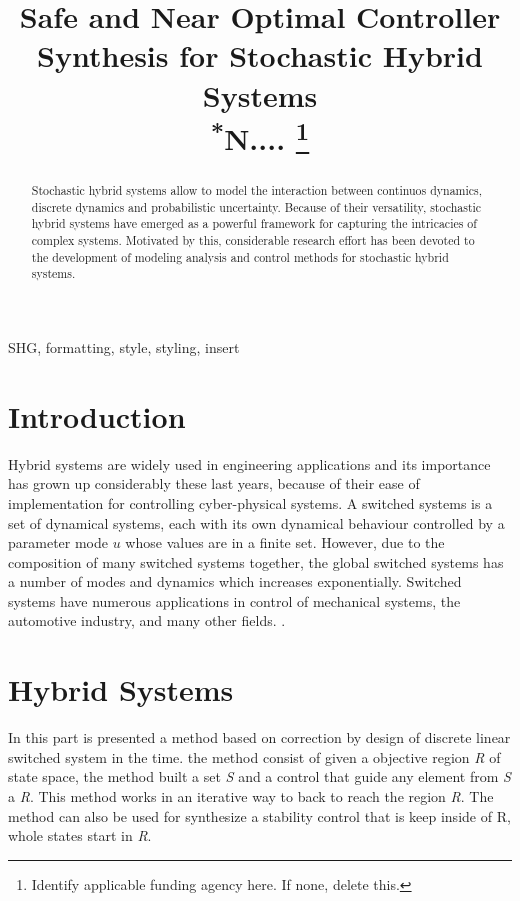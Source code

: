 \documentclass[conference]{IEEEtran}
\begin{document}
\title{Safe and Near Optimal Controller Synthesis for Stochastic Hybrid Systems\\
{\footnotesize \textsuperscript{*}N....}
\thanks{Identify applicable funding agency here. If none, delete this.}
}


\maketitle

\begin{abstract}
    Stochastic hybrid systems allow to model the interaction between continuos dynamics,
discrete dynamics and probabilistic uncertainty. Because of their versatility,
stochastic hybrid systems have emerged as a powerful framework for capturing 
the intricacies of complex systems. Motivated by this, considerable research effort 
has been devoted to the development of modeling analysis and control 
methods for stochastic hybrid systems. 

\end{abstract}

\begin{IEEEkeywords}
SHG, formatting, style, styling, insert
\end{IEEEkeywords}

\section{Introduction}
Hybrid systems are widely used in engineering applications and its 
importance has grown up considerably these last years, because of their 
ease of implementation for controlling cyber-physical systems.
A switched systems is a set of dynamical systems, each with its own 
dynamical behaviour controlled by a parameter mode $u$ whose values 
are in a finite set. However, due to the composition of many switched 
systems together, the global switched systems has a number of modes 
and dynamics which increases exponentially. Switched systems have 
numerous applications in control of mechanical systems, the automotive
 industry, and many other fields. 
\cite{larsen2016online}.


\section{Hybrid Systems}
In this part is presented a method based on correction by design of
 discrete linear switched system in the time. the method consist of 
 given a objective region \emph{R} of state space, the method built 
 a set \emph{S} and a control that guide any element from  \emph{S} 
 a \emph{R}. This method works in an iterative way to back to reach 
 the region \emph{R}. The method  can also be used for synthesize 
 a stability control that is keep inside of R, whole states start in
  \emph{R}.
\end{document}
